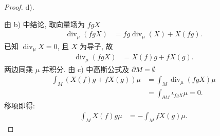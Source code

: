 \documentclass[../main.tex]{subfiles}
\begin{document}
\begin{proof}
 d).

由 b) 中结论, 取向量场为 $fgX$
$$
\begin{aligned}
\operatorname{div}_\mu(fgX) &= fg\operatorname{div}_\mu(X) + X(fg).
\end{aligned}
$$
已知 $\operatorname{div}_\mu X = 0$, 且 $X$ 为导子, 故
$$
\begin{aligned}
\operatorname{div}_\mu(fgX) &= X(f)g + fX(g).
\end{aligned}
$$
两边同乘 $\mu$ 并积分. 由 c) 中高斯公式及 $\partial M = \emptyset$
$$
\begin{aligned}
\int_M (X(f)g + fX(g))\mu &= \int_M \operatorname{div}_\mu(fgX)\mu \\
&= \int_{\partial M} \iota_{fgX}\mu = 0.
\end{aligned}
$$
移项即得:
$$
\begin{aligned}
\int_M X(f)g\mu &= -\int_M fX(g)\mu.
\end{aligned}
$$
\end{proof}
\end{document}
